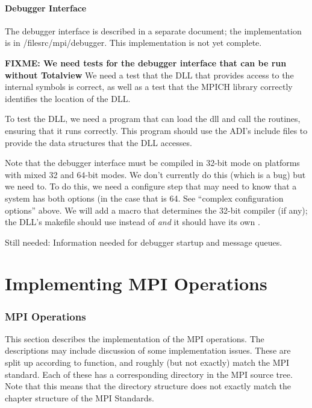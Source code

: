 \documentclass{article}
\def\fixme#1{\marginpar{FIXME:}\textbf{FIXME: #1}}
\begin{document}
\subsection{Debugger Interface}
\label{sec:debug-interface}

The debugger interface is described in a separate document; the
implementation is in /file{src/mpi/debugger}.  This implementation is
not yet complete.

\fixme{We need tests for the debugger interface that can be run
  without Totalview}
We need a test that the DLL that provides access to the internal
symbols is correct, as well as a test that the MPICH library correctly
identifies the location of the DLL.

To test the DLL, we need a program  that can
load the dll and call the routines, ensuring that it runs correctly.
This program should use the ADI's include files to provide the data
structures that the DLL accesses.

Note that the debugger interface must be compiled in 32-bit mode on
platforms with mixed 32 and 64-bit modes.  We don't currently do this
(which is a bug) but we need to.  To do this, we need a configure step
that may need to know that a system has both options (in the case that
 is 64.  See ``complex configuration
options'' above.  We will add a macro  that
determines the 32-bit compiler (if any); the DLL's makefile should use
 instead of  \emph{and} it should have its own
. 

Still needed: Information needed for debugger startup and message
queues.

\part{Implementing MPI Operations}
\section{MPI Operations}
\label{sec:mpi-operations}
This section describes the implementation of the MPI operations.  The
descriptions may include discussion of some implementation issues.
These are split up according to function, and roughly (but not
exactly) match the MPI standard.  Each of these has a corresponding
directory in the MPI source tree.  Note that this means that the
directory structure does not exactly match the chapter structure of
the MPI Standards.
\end{document}
